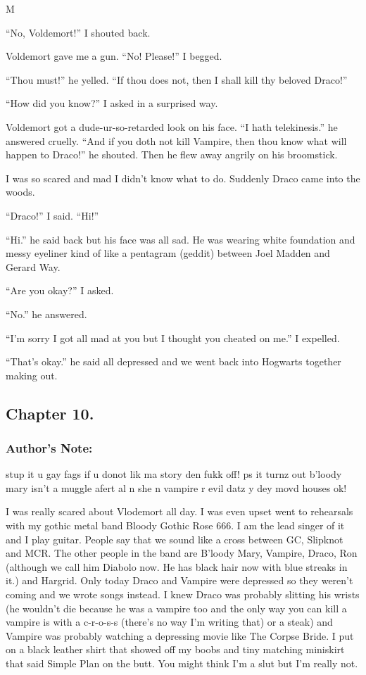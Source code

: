 M\documentclass{article}
\begin{document}
“No, Voldemort!” I shouted back.

Voldemort gave me a gun. “No! Please!” I begged.

“Thou must!” he yelled. “If thou does not, then I shall kill thy beloved Draco!”

“How did you know?” I asked in a surprised way.

Voldemort got a dude-ur-so-retarded look on his face. “I hath telekinesis.” he answered cruelly. “And if you doth not kill Vampire, then thou know what will happen to Draco!” he shouted. Then he flew away angrily on his broomstick.

I was so scared and mad I didn’t know what to do. Suddenly Draco came into the woods.

“Draco!” I said. “Hi!”

“Hi.” he said back but his face was all sad. He was wearing white foundation and messy eyeliner kind of like a pentagram (geddit) between Joel Madden and Gerard Way.

“Are you okay?” I asked.

“No.” he answered.

“I’m sorry I got all mad at you but I thought you cheated on me.” I expelled.

“That’s okay.” he said all depressed and we went back into Hogwarts together making out.

\clearpage\nolinenumbers
\subsection*{Chapter 10.}

\subsubsection*{Author's Note: }stup it u gay fags if u donot lik ma story den fukk off! ps it turnz out b’loody mary isn’t a muggle afert al n she n vampire r evil datz y dey movd houses ok!

\textbreak
\linenumbers\resetlinenumber

I was really scared about Vlodemort all day. I was even upset went to rehearsals with my gothic metal band Bloody Gothic Rose 666. I am the lead singer of it and I play guitar. People say that we sound like a cross between GC, Slipknot and MCR. The other people in the band are B’loody Mary, Vampire, Draco, Ron (although we call him Diabolo now. He has black hair now with blue streaks in it.) and Hargrid. Only today Draco and Vampire were depressed so they weren’t coming and we wrote songs instead. I knew Draco was probably slitting his wrists (he wouldn’t die because he was a vampire too and the only way you can kill a vampire is with a c-r-o-s-s (there’s no way I’m writing that) or a steak) and Vampire was probably watching a depressing movie like The Corpse Bride. I put on a black leather shirt that showed off my boobs and tiny matching miniskirt that said Simple Plan on the butt. You might think I’m a slut but I’m really not.
\end{document}
